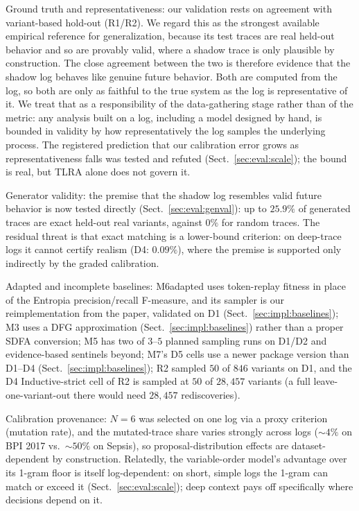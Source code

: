 \documentclass[runningheads]{llncs}
\newcommand{\chg}[1]{\textcolor{chgblue}{#1}}
\begin{document}
Ground truth and representativeness: our validation rests on agreement with variant-based hold-out (R1/R2). We regard this as the strongest available empirical reference for generalization, because its test traces are real held-out behavior and so are provably valid, where a shadow trace is only plausible by construction. The close agreement between the two is therefore evidence that the shadow log behaves like genuine future behavior. Both are computed from the log, so both are only as faithful to the true system as the log is representative of it. We treat that as a responsibility of the data-gathering stage rather than of the metric: any analysis built on a log, including a model designed by hand, is bounded in validity by how representatively the log samples the underlying process. \chg{The registered prediction that our calibration error grows as representativeness falls was tested and refuted (Sect.~\ref{sec:eval:scale}); the bound is real, but TLRA alone does not govern it.}

\chg{Generator validity: the premise that the shadow log resembles valid future behavior is now tested directly (Sect.~\ref{sec:eval:genval}): up to $25.9\%$ of generated traces are exact held-out real variants, against $0\%$ for random traces. The residual threat is that exact matching is a lower-bound criterion: on deep-trace logs it cannot certify realism (D4: $0.09\%$), where the premise is supported only indirectly by the graded calibration.}

Adapted and incomplete baselines: M6adapted uses token-replay fitness in place of the Entropia precision/recall F-measure\chg{, and its sampler is our reimplementation from the paper, validated on D1} (Sect.~\ref{sec:impl:baselines}); M3 uses a DFG approximation (Sect.~\ref{sec:impl:baselines}) rather than a proper SDFA conversion; M5 has two of $3$--$5$ planned sampling runs \chg{on D1/D2 and evidence-based sentinels beyond}; \chg{M7's D5 cells use a newer package version than D1--D4 (Sect.~\ref{sec:impl:baselines})}; R2 sampled $50$ of $846$ variants on D1\chg{, and the D4 Inductive-strict cell of R2 is sampled at $50$ of $28{,}457$ variants (a full leave-one-variant-out there would need $28{,}457$ rediscoveries)}.

Calibration provenance: $N{=}6$ was selected on one log via a proxy criterion (mutation rate), and the mutated-trace share varies strongly across logs ($\sim4\%$ on BPI 2017 vs.\ $\sim50\%$ on Sepsis), so proposal-distribution effects are dataset-dependent by construction. \chg{Relatedly, the variable-order model's advantage over its 1-gram floor is itself log-dependent: on short, simple logs the 1-gram can match or exceed it (Sect.~\ref{sec:eval:scale}); deep context pays off specifically where decisions depend on it.}
\end{document}
